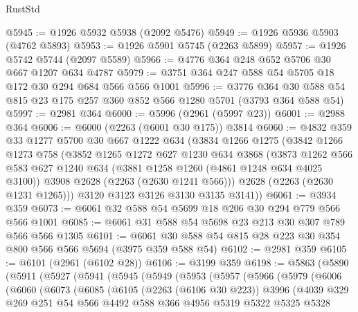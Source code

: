 \begin{lexlean}{RustStd}
\begin{coremodule}
@5945 := @1926 @5932 @5938 (@2092 @5476)
@5949 := @1926 @5936 @5903 (@4762 @5893)
@5953 := @1926 @5901 @5745 (@2263 @5899)
@5957 := @1926 @5742 @5744 (@2097 @5589)
@5966 := @4776 @364 @248 @652 @5706 @30 @667 @1207 @634 @4787
@5979 := @3751 @364 @247 @588 @54 @5705 @18 @172 @30 @294 @684 @566 @566 @1001
@5996 := @3776 @364 @30 @588 @54 @815 @23 @175 @257 @360 @852 @566 @1280 @5701 (@3793 @364 @588 @54)
@5997 := @2981 @364
@6000 := @5996 (@2961 (@5997 @23))
@6001 := @2988 @364
@6006 := @6000 (@2263 (@6001 @30 @175)) @3814
@6060 := @4832
    @359
    @33
    @1277
    @5700
    @30
    @667
    @1222
    @634
    (@3834
      @1266
      @1275
      (@3842
        @1266
        @1273
        @758
        (@3852
          @1265
          @1272
          @627
          @1230
          @634
          @3868
          (@3873
            @1262
            @566
            @583
            @627
            @1240
            @634
            (@3881 @1258 @1260 (@4861 @1248 @634 @4025 @3100))
            @3908
            @2628
            (@2263 (@2630 @1241 @566)))
          @2628
          (@2263 (@2630 @1231 @1265)))
        @3120
        @3123
        @3126
        @3130
        @3135
        @3141))
@6061 := @3934 @359
@6073 := @6061 @32 @588 @54 @5699 @18 @206 @30 @294 @779 @566 @566 @1001
@6085 := @6061 @31 @588 @54 @5698 @23 @213 @30 @307 @789 @566 @566 @1305
@6101 := @6061 @30 @588 @54 @815 @28 @223 @30 @354 @800 @566 @566 @5694 (@3975 @359 @588 @54)
@6102 := @2981 @359
@6105 := @6101 (@2961 (@6102 @28))
@6106 := @3199 @359
@6198 := @5863
    (@5890
      (@5911
        (@5927
          (@5941
            (@5945
              (@5949
                (@5953
                  (@5957
                    (@5966
                      (@5979
                        (@6006
                          (@6060
                            (@6073
                              (@6085
                                (@6105
                                  (@2263 (@6106 @30 @223))
                                  @3996
                                  (@4039
                                    @329
                                    @269
                                    @251
                                    @54
                                    @566
                                    @4492
                                    @588
                                    @366
                                    @4956
                                    @5319
                                    @5322
                                    @5325
                                    @5328

\end{coremodule}
\end{lexlean}
